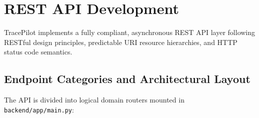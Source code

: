 \documentclass[11pt,a4paper]{article}
\begin{document}
\section{REST API Development}
TracePilot implements a fully compliant, asynchronous REST API layer following RESTful design principles, predictable URI resource hierarchies, and HTTP status code semantics.

\subsection{Endpoint Categories and Architectural Layout}
The API is divided into logical domain routers mounted in \texttt{backend/app/main.py}:
\end{document}
